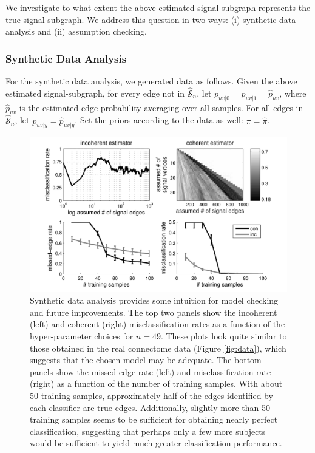 \documentclass[10pt,journal,cspaper,compsoc]{IEEEtran}
\providecommand{\tk}[1]{\textcolor{black}{#1}}
\providecommand{\wh}[1]{\widehat{#1}}
\providecommand{\mhc}[1]{\widehat{\mathcal{#1}}}
\newcommand{\comment}[1]{}
\begin{document}
\comment{Although the signal-subgraph classifier employed above estimated a signal-subgraph, w}We investigate to what extent the \tk{above} estimated signal-subgraph represents the true signal-subgraph.  We address this question in two ways:  (i) synthetic data analysis and (ii) assumption checking.  

\subsubsection{Synthetic Data Analysis} %
\label{ssub:synthetic_data_analysis}

For the synthetic data analysis, we generated data as follows.  Given the above estimated signal-subgraph, for every edge not in $\mhc{S}_n$, let $p_{uv|0}=p_{uv|1}=\wh{p}_{uv}$, where $\wh{p}_{uv}$ is the estimated edge probability averaging over all samples.  For all edges in $\mhc{S}_n$, let $p_{uv|y}=\wh{p}_{uv|y}$.  Set the priors according to the data as well: $\pi=\wh{\pi}$.  

\begin{figure}[tb!]
	\centering
		\includegraphics[width=0.7\linewidth]{BLSA0317_Count_synthetic_Lhats.pdf}
	\caption{Synthetic data analysis provides some intuition for model checking and future improvements.  The top two panels show the incoherent (left) and coherent (right) misclassification rates as a function of the hyper-parameter choices for $n=49$.  These plots look quite similar to those obtained in the real connectome data (Figure \ref{fig:data}), which suggests that the chosen model may be adequate.  The bottom panels show the missed-edge rate (left) and misclassification rate (right) as a function of the number of training samples.  With about 50 training samples, approximately half of the edges identified by each classifier are true edges.  Additionally, slightly more than 50 training samples seems to be sufficient for obtaining nearly perfect classification, suggesting that perhaps only a few more subjects would be sufficient to yield much greater classification performance.}
	\label{fig:synthetic}
\end{figure}
\end{document}
